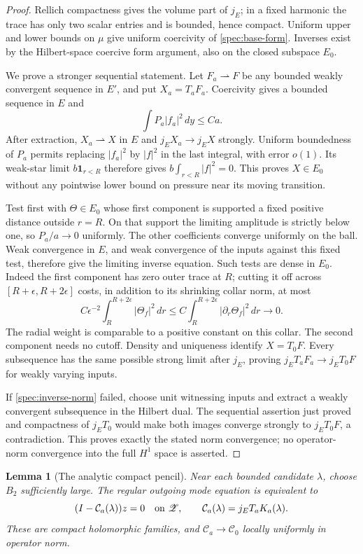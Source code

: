 \documentclass[11pt]{article}
\numberwithin{equation}{section}
\newtheorem{lemma}[theorem]{Lemma}
\theoremstyle{definition}
\theoremstyle{remark}
\begin{document}
\begin{proof}
Rellich compactness gives the volume part of $j_E$; in a fixed harmonic
the trace has only two scalar entries and is bounded, hence compact.
Uniform upper and lower bounds on $\mu$ give uniform coercivity of
\eqref{spec:base-form}. Inverses exist by the Hilbert-space coercive
form argument, also on the closed subspace $E_0$.

We prove a stronger sequential statement. Let $F_a\rightharpoonup F$
be any bounded weakly convergent sequence in $E'$, and put
$X_a=T_aF_a$. Coercivity gives a bounded sequence in $E$ and
\[
 \int P_a|f_a|^2\,dy\le Ca.
\]
After extraction, $X_a\rightharpoonup X$ in $E$ and $j_EX_a\to j_EX$
strongly. Uniform boundedness of $P_a$ permits replacing $|f_a|^2$
by $|f|^2$ in the last integral, with error $o(1)$. Its weak-star
limit $b\mathbf1_{r<R}$ therefore gives
$b\int_{r<R}|f|^2=0$. This proves $X\in E_0$ without any pointwise
lower bound on pressure near its moving transition.

Test first with $\Theta\in E_0$ whose first component is supported a
fixed positive distance outside $r=R$. On that support the limiting
amplitude is strictly below one, so $P_a/a\to0$ uniformly. The other
coefficients converge uniformly on the ball. Weak convergence in
$E$, and weak convergence of the inputs against this fixed test,
therefore give the limiting inverse equation.
Such tests are dense in $E_0$. Indeed the first component has zero
outer trace at $R$; cutting it off across $[R+\epsilon,R+2\epsilon]$
costs, in addition to its shrinking collar norm, at most
\[
 C\epsilon^{-2}\int_R^{R+2\epsilon}|\Theta_f|^2\,dr
 \le C\int_R^{R+2\epsilon}|\partial_r\Theta_f|^2\,dr
 \longrightarrow0.
\]
The radial weight is comparable to a positive constant on this
collar. The second component needs no cutoff. Density and uniqueness
identify $X=T_0F$. Every subsequence has the same possible strong
limit after $j_E$, proving
$j_ET_aF_a\to j_ET_0F$ for weakly varying inputs.

If \eqref{spec:inverse-norm} failed, choose unit witnessing inputs
and extract a weakly convergent subsequence in the Hilbert dual.
The sequential assertion just proved and compactness of $j_ET_0$
would make both images converge strongly to $j_ET_0F$, a
contradiction. This proves exactly the stated norm convergence; no
operator-norm convergence into the full $H^1$ space is asserted.
\end{proof}

\begin{lemma}[The analytic compact pencil]\label{spec:compact-pencil}
Near each bounded candidate $\lambda$, choose $B_2$ sufficiently large.
The regular outgoing mode equation is equivalent to
\begin{equation}\label{spec:compact-equation}
 (I-\mathcal C_a(\lambda))z=0\quad\hbox{on }\mathscr Z,\qquad
 \mathcal C_a(\lambda)=j_ET_aK_a(\lambda).
\end{equation}
These are compact holomorphic families, and
$\mathcal C_a\to\mathcal C_0$ locally uniformly in operator norm.
\end{lemma}
\end{document}
